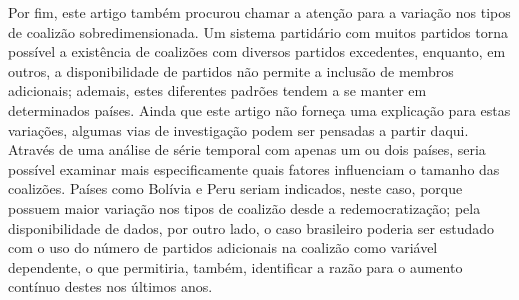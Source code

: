 Por fim, este artigo também procurou chamar a atenção para a variação nos tipos de coalizão sobredimensionada. Um sistema partidário com muitos partidos torna possível a existência de coalizões com diversos partidos excedentes, enquanto, em outros, a disponibilidade de partidos não permite a inclusão de membros adicionais; ademais, estes diferentes padrões tendem a se manter em determinados países. Ainda que este artigo não forneça uma explicação para estas variações, algumas vias de investigação podem ser pensadas a partir daqui. Através de uma análise de série temporal com apenas um ou dois países, seria possível examinar mais especificamente quais fatores influenciam o tamanho das coalizões. Países como Bolívia e Peru seriam indicados, neste caso, porque possuem maior variação nos tipos de coalizão desde a redemocratização; pela disponibilidade de dados, por outro lado, o caso brasileiro poderia ser estudado com o uso do número de partidos adicionais na coalizão como variável dependente, o que permitiria, também, identificar a razão para o aumento contínuo destes nos últimos anos.
